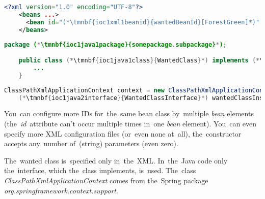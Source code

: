 \begin{lstlisting}[language=XML, title={Configuration XML}]
    <?xml version="1.0" encoding="UTF-8"?>
    <beans ...>
      <bean id="(*\tmnbf{ioc1xml1beanid}{wantedBeanId}[ForestGreen]*)" class="(*\tmnbf{ioc1xml1package}{somepackage.subpackage}[ForestGreen]*).(*\tmnbf{ioc1xml1class}{WantedClass}[ForestGreen]*)"/>
    </beans>
\end{lstlisting}
\begin{lstlisting}[language=Java, title={Wanted class}]
    package (*\tmnbf{ioc1java1package}{somepackage.subpackage}*);

    public class (*\tmnbf{ioc1java1class}{WantedClass}*) implements (*\tmnbf{ioc1java1interface}{WantedClassInterface}*) {
        ...
    }
\end{lstlisting}
\begin{lstlisting}[language=Java, title={Usage}]
    ClassPathXmlApplicationContext context = new ClassPathXmlApplicationContext("configurationFile.xml");
    (*\tmnbf{ioc1java2interface}{WantedClassInterface}*) wantedClassInstance = context.getBean("(*\tmnbf{ioc1java2beanid}{wantedBeanId}[ForestGreen]*)", (*\tmnbf{ioc1java2interface2}{WantedClassInterface}*).class);
\end{lstlisting}

\noindent You~can configure more IDs for~the~same bean class by~multiple \textit{bean} elements (the~\textit{id}~attribute can't occur multiple times in~one \textit{bean} element).
You~can even specify more XML configuration files (or~even none at~all), the~constructor  accepts any~number of~(string) parameters (even zero).

The~wanted class is~specified only in~the~XML\@.
In~the~Java code only the~interface, which the~class implements, is~used.
The~class \textit{ClassPathXmlApplicationContext} comes from the~Spring package \textit{org.springframework.context.support}.

